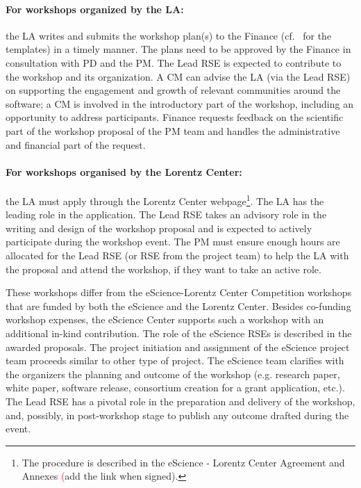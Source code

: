 \paragraph{For workshops organized by the LA:} the LA writes and submits the workshop plan(s) to the Finance (cf.~\cite{proj-templates} 
for the templates) in a timely manner. The plans need to be approved by the Finance in consultation with PD and the PM. The
Lead RSE is expected to contribute to the workshop and its organization. A CM can advise the LA (via the Lead RSE) on
supporting the engagement and growth of relevant communities around the software; a CM is involved in the introductory
part of the workshop, including an opportunity to address participants. Finance requests feedback on the scientific part 
of the workshop proposal of the PM team and handles the administrative and financial part of the request. 
%
\paragraph{For workshops organised by the Lorentz Center:} the LA must apply through the Lorentz Center webpage\footnote{The
procedure is described in the eScience - Lorentz Center Agreement and Annexes {\textcolor{red}(add the link when signed)}.}.
%
The LA has the leading role in the application. The Lead RSE takes an advisory role in the writing and design of the
workshop proposal and is expected to actively participate during the workshop event. The PM must ensure enough hours
are allocated for the Lead RSE (or RSE from the project team) to help the LA with the proposal and attend the workshop,
if they want to take an active role.

These workshops differ from the eScience-Lorentz Center Competition workshops that are funded by both the eScience and
the Lorentz Center. Besides co-funding workshop expenses, the eScience Center supports such a workshop with an
additional in-kind contribution. The role of the eScience RSEs is described in the awarded proposals. The project
initiation and assignment of the eScience project team proceeds similar to other type of project. The eScience team
clarifies with the organizers the planning and outcome of the workshop (e.g. research paper, white paper, software
release, consortium creation for a grant application, etc.). The Lead RSE has a pivotal role in the preparation and
delivery of the workshop, and, possibly, in post-workshop stage to publish any outcome drafted during the event. 

